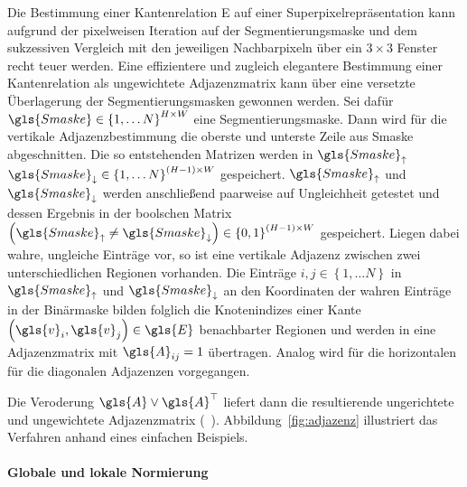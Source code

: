 Die Bestimmung einer Kantenrelation \gls{E} auf einer Superpixelrepräsentation kann aufgrund der pixelweisen Iteration auf der Segmentierungsmaske und dem sukzessiven Vergleich mit den jeweiligen Nachbarpixeln über ein $3 \times 3$ Fenster recht teuer werden.
Eine effizientere und zugleich elegantere Bestimmung einer Kantenrelation als ungewichtete Adjazenzmatrix kann über eine versetzte Überlagerung der Segmentierungsmasken gewonnen werden.
Sei dafür $\gls{Smaske} \in {\left\{1, \ldots N\right\}}^{H \times W}$ eine Segmentierungsmaske.
Dann wird für die vertikale Adjazenzbestimmung die oberste und unterste Zeile aus \gls{Smaske} abgeschnitten.
Die so entstehenden Matrizen werden in $\gls{Smaske}_{\uparrow}$ \bzw{} $\gls{Smaske}_{\downarrow} \in {\left\{1, \ldots N\right\}}^{\left(H-1\right) \times W}$ gespeichert.
$\gls{Smaske}_{\uparrow}$ und $\gls{Smaske}_{\downarrow}$ werden anschließend paarweise auf Ungleichheit getestet und dessen Ergebnis in der boolschen Matrix $\left(\gls{Smaske}_{\uparrow} \neq \gls{Smaske}_{\downarrow}\right) \in {\left\{0, 1\right\}}^{\left(H-1\right) \times W}$ gespeichert.
Liegen dabei wahre, \dhe{} ungleiche Einträge vor, so ist eine vertikale Adjazenz zwischen zwei unterschiedlichen Regionen vorhanden.
Die Einträge $i,j \in \left\{1, \ldots N \right\}$ in $\gls{Smaske}_{\uparrow}$ und $\gls{Smaske}_{\downarrow}$ an den Koordinaten der wahren Einträge in der Binärmaske bilden folglich die Knotenindizes einer Kante $\left(\gls{v}_i, \gls{v}_j\right) \in \gls{E}$ benachbarter Regionen und werden in eine Adjazenzmatrix mit $\gls{A}_{ij}=1$ übertragen.
Analog wird für die horizontalen \bzw{} für die diagonalen Adjazenzen vorgegangen.

Die Veroderung $\gls{A} \vee \gls{A}^{\top}$ liefert dann die resultierende ungerichtete und ungewichtete Adjazenzmatrix (\vgl{}~\cite{stackoverflow}).
Abbildung~\ref{fig:adjazenz} illustriert das Verfahren anhand eines einfachen Beispiels.

\paragraph{Globale und lokale Normierung}
\label{globale_lokale_normierung}

